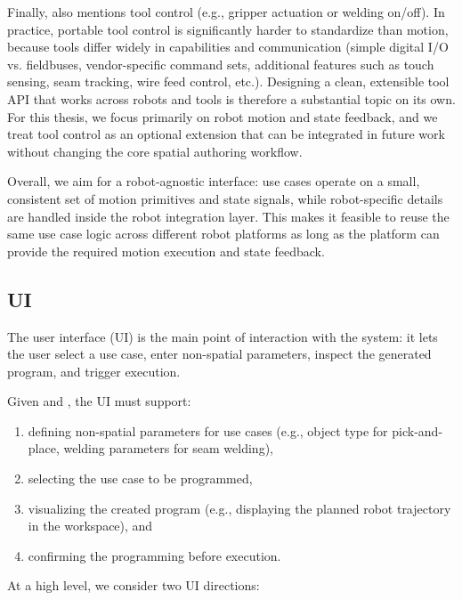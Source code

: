 Finally,  also mentions tool control (e.g., gripper actuation or welding on/off). In practice, portable tool control is significantly harder to standardize than motion, because tools differ widely in capabilities and communication (simple digital I/O vs. fieldbuses, vendor-specific command sets, additional features such as touch sensing, seam tracking, wire feed control, etc.). Designing a clean, extensible tool API that works across robots and tools is therefore a substantial topic on its own. For this thesis, we focus primarily on robot motion and state feedback, and we treat tool control as an optional extension that can be integrated in future work without changing the core spatial authoring workflow.

Overall, we aim for a robot-agnostic interface: use cases operate on a small, consistent set of motion primitives and state signals, while robot-specific details are handled inside the robot integration layer. This makes it feasible to reuse the same use case logic across different robot platforms as long as the platform can provide the required motion execution and state feedback.

\subsection{UI} \label{subsec:ch2_analysis_ui}

The user interface (UI) is the main point of interaction with the system: it lets the user select a use case, enter non-spatial parameters, inspect the generated program, and trigger execution.

Given  and , the UI must support:
\begin{enumerate}[label=(\roman*)]
    \item defining non-spatial parameters for use cases (e.g., object type for pick-and-place, welding parameters for seam welding),
    \item selecting the use case to be programmed,
    \item visualizing the created program (e.g., displaying the planned robot trajectory in the workspace), and
    \item confirming the programming before execution.
\end{enumerate}

At a high level, we consider two UI directions:

